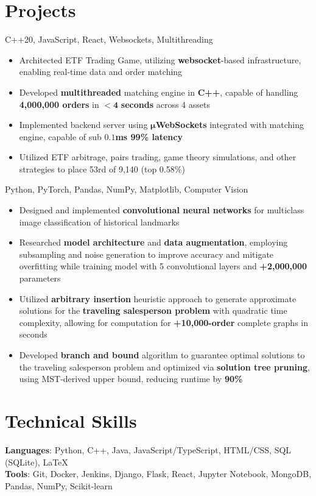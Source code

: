 \documentclass[letterpaper,11pt]{article}
\begin{document}
\section{Projects}
{C++20, JavaScript, React, Websockets, Multithreading}{}
\begin{itemize}
    \item Architected ETF Trading Game, utilizing \textbf{websocket}-based
        infrastructure, enabling real-time data and order matching
    \item Developed \textbf{multithreaded} matching engine in \textbf{C++}, capable of
    handling \textbf{4,000,000 orders} in $\mathbf{< 4}$ \textbf{seconds} across 4 assets
\item Implemented backend server using $\mathbf{\mu}$\textbf{WebSockets}
    integrated with matching engine, capable of sub $\mathbf{0.1}$\textbf{ms 99\% latency}
\end{itemize}
\begin{itemize}
    \item Utilized ETF arbitrage, pairs trading, game theory simulations, and
        other strategies to place 53rd of 9,140 (top 0.58\%)
\end{itemize}
{Python, PyTorch, Pandas, NumPy, Matplotlib, Computer Vision}{}
\begin{itemize}
    \item Designed and implemented \textbf{convolutional neural networks} for multiclass
        image classification of historical landmarks
    \item Researched \textbf{model architecture} and \textbf{data augmentation},
        employing subsampling and noise generation to improve accuracy and mitigate
        overfitting while training model with 5 convolutional layers and
        \textbf{+2,000,000} parameters
\end{itemize}
\begin{itemize}
    \item Utilized \textbf{arbitrary insertion} heuristic approach to generate
        approximate solutions for the \textbf{traveling salesperson problem} with
        quadratic time complexity, allowing for computation for \textbf{+10,000-order}
        complete graphs in seconds
    \item Developed \textbf{branch and bound} algorithm to guarantee optimal solutions to
        the traveling salesperson problem and optimized via \textbf{solution tree
        pruning}, using MST-derived upper bound, reducing runtime by \textbf{90\%}
\end{itemize}
\section{Technical Skills}
\textbf{Languages}: Python, C++, Java, JavaScript/TypeScript, HTML/CSS,
SQL (SQLite), \LaTeX \\
\textbf{Tools}: Git, Docker, Jenkins, Django, Flask, React,
Jupyter Notebook, MongoDB, Pandas, NumPy, Scikit-learn
\end{document}
